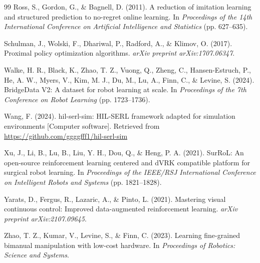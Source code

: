 \documentclass[12pt,a4paper]{article}
\begin{document}
\begin{thebibliography}{99}
Ross, S., Gordon, G., \& Bagnell, D. (2011). A reduction of imitation learning and structured prediction to no-regret online learning. In \emph{Proceedings of the 14th International Conference on Artificial Intelligence and Statistics} (pp. 627--635).

Schulman, J., Wolski, F., Dhariwal, P., Radford, A., \& Klimov, O. (2017). Proximal policy optimization algorithms. \emph{arXiv preprint arXiv:1707.06347}.

Walke, H. R., Black, K., Zhao, T. Z., Vuong, Q., Zheng, C., Hansen-Estruch, P., He, A. W., Myers, V., Kim, M. J., Du, M., Lu, A., Finn, C., \& Levine, S. (2024). BridgeData V2: A dataset for robot learning at scale. In \emph{Proceedings of the 7th Conference on Robot Learning} (pp. 1723--1736).

Wang, F. (2024). hil-serl-sim: HIL-SERL framework adapted for simulation environments [Computer software]. Retrieved from \url{https://github.com/ggggfff1/hil-serl-sim}

Xu, J., Li, B., Lu, B., Liu, Y. H., Dou, Q., \& Heng, P. A. (2021). SurRoL: An open-source reinforcement learning centered and dVRK compatible platform for surgical robot learning. In \emph{Proceedings of the IEEE/RSJ International Conference on Intelligent Robots and Systems} (pp. 1821--1828).

Yarats, D., Fergus, R., Lazaric, A., \& Pinto, L. (2021). Mastering visual continuous control: Improved data-augmented reinforcement learning. \emph{arXiv preprint arXiv:2107.09645}.

Zhao, T. Z., Kumar, V., Levine, S., \& Finn, C. (2023). Learning fine-grained bimanual manipulation with low-cost hardware. In \emph{Proceedings of Robotics: Science and Systems}.

\end{thebibliography}
\end{document}
